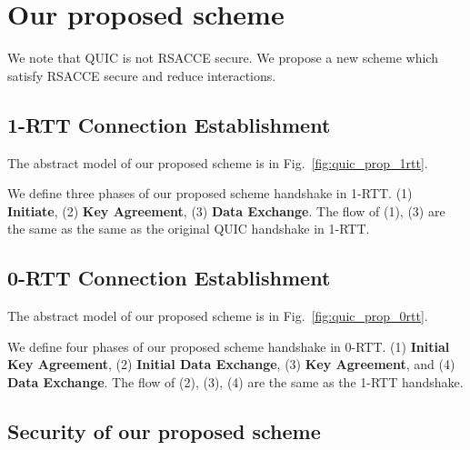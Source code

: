 \section{Our proposed scheme} \label{sec:proposed_scheme}

We note that QUIC is not RSACCE secure.
We propose a new scheme which satisfy RSACCE secure and
reduce interactions.

\subsection{1-RTT Connection Establishment} \label{sec:quic_prop_1rtt}

The abstract model of our proposed scheme is in
Fig.~\ref{fig:quic_prop_1rtt}.



We define three phases of our proposed scheme handshake in 1-RTT.
(1) \textbf{Initiate},
(2) \textbf{Key Agreement},
(3) \textbf{Data Exchange}.
The flow of (1), (3) are the same as the same as the original QUIC
handshake in 1-RTT.



\subsection{0-RTT Connection Establishment} \label{sec:quic_prop_0rtt}

The abstract model of our proposed scheme is in
Fig.~\ref{fig:quic_prop_0rtt}.



We define four phases of our proposed scheme handshake in 0-RTT.
(1) \textbf{Initial Key Agreement},
(2) \textbf{Initial Data Exchange},
(3) \textbf{Key Agreement}, and
(4) \textbf{Data Exchange}.
The flow of (2), (3), (4) are the same as the 1-RTT
handshake.


\subsection{Security of our proposed scheme} \label{sec:quic_proof}

